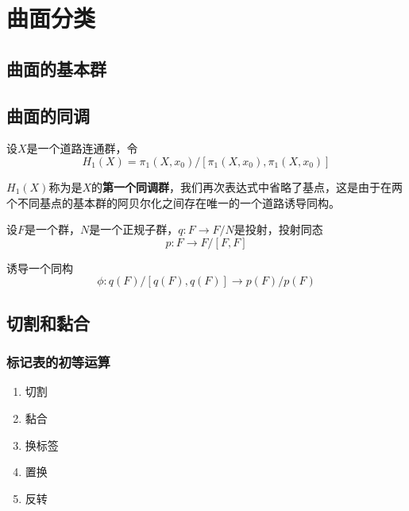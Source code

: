 \chapter{曲面分类}


\section{曲面的基本群}

\section{曲面的同调}

设$X$是一个道路连通群，令
\begin{equation}
    H_1(X)=\pi_1(X,x_0)/[\pi_1(X,x_0),\pi_1(X,x_0)]
\end{equation}

$H_1(X)$称为是$X$的\textbf{第一个同调群}，我们再次表达式中省略了基点，这是由于在两个不同基点的基本群的阿贝尔化之间存在唯一的一个道路诱导同构。

\begin{mdframed}
    \begin{theorem}
        设$F$是一个群，$N$是一个正规子群，$q:F\rightarrow F/N$是投射，投射同态
        \begin{equation}
            p:F\rightarrow F/[F,F]
        \end{equation}
        
        诱导一个同构
        \begin{equation}
            \phi:q(F)/[q(F),q(F)]\rightarrow p(F)/p(F)
        \end{equation}
    \end{theorem}
\end{mdframed}

\section{切割和黏合}

\subsection*{标记表的初等运算}
\begin{enumerate}[itemindent=2em]
    \item 切割
    \item 黏合
    \item 换标签
    \item 置换
    \item 反转
\end{enumerate}

